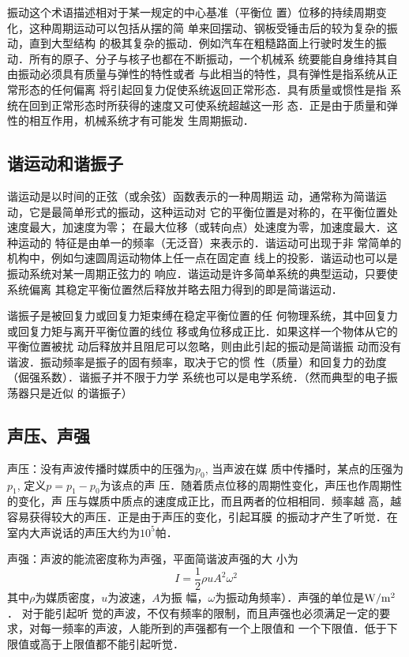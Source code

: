 振动这个术语描述相对于某一规定的中心基准（平衡位
置）位移的持续周期变化，这种周期运动可以包括从摆的简
单来回摆动、钢板受锤击后的较为复杂的振动，直到大型结构
的极其复杂的振动．例如汽车在粗糙路面上行驶时发生的振
动．所有的原子、分子与核子也都在不断振动，一个机械系
统要能自身维持其自由振动必须具有质量与弹性的特性或者
与此相当的特性，具有弹性是指系统从正常形态的任何偏离
将引起回复力促使系统返回正常形态．具有质量或惯性是指
系统在回到正常形态时所获得的速度又可使系统超越这一形
态．正是由于质量和弹性的相互作用，机械系统才有可能发
生周期振动．

\subsection{谐运动和谐振子}
谐运动是以时间的正弦（或余弦）函数表示的一种周期运
动，通常称为简谐运动，它是最简单形式的振动，这种运动对
它的平衡位置是对称的，在平衡位置处速度最大，加速度为零；
在最大位移（或转向点）处速度为零，加速度最大．这种运动的
特征是由单一的频率（无泛音）来表示的．谐运动可出现于非
常简单的机构中，例如匀速圆周运动物体上任一点在固定直
线上的投影．谐运动也可以是振动系统对某一周期正弦力的
响应．谐运动是许多简单系统的典型运动，只要使系统偏离
其稳定平衡位置然后释放并略去阻力得到的即是简谐运动．

谐振子是被回复力或回复力矩束缚在稳定平衡位置的任
何物理系统，其中回复力或回复力矩与离开平衡位置的线位
移或角位移成正比．如果这样一个物体从它的平衡位置被扰
动后释放并且阻尼可以忽略，则由此引起的振动是简谐振
动而没有谐波．振动频率是振子的固有频率，取决于它的惯
性（质量）和回复力的劲度（倔强系数）．谐振子并不限于力学
系统也可以是电学系统．（然而典型的电子振荡器只是近似
的谐振子）

\subsection{声压、声强}
声压：没有声波传播时媒质中的压强为$p_0$, 当声波在媒
质中传播时，某点的压强为$p_1$, 定义$p=p_1-p_0$为该点的声
压．随着质点位移的周期性变化，声压也作周期性的变化，声
压与媒质中质点的速度成正比，而且两者的位相相同．频率越
高，越容易获得较大的声压．正是由于声压的变化，引起耳膜
的振动才产生了听觉．在室内大声说话的声压大约为$10^5$帕．

声强：声波的能流密度称为声强，平面简谐波声强的大
小为
\[I=\frac{1}{2}\rho uA^2\omega^2\]
其中$\rho$为媒质密度，$u$为波速，$A$为振
幅，$\omega$为振动角频率）．声强的单位是${\rm W/m^2}$．
对于能引起听
觉的声波，不仅有频率的限制，而且声强也必须满足一定的要
求，对每一频率的声波，人能所到的声强都有一个上限值和
一个下限值．低于下限值或高于上限值都不能引起听觉．

